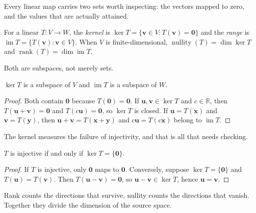 Every linear map carries two sets worth inspecting: the vectors mapped to zero,
and the values that are actually attained.


\begin{definisi}
For a linear $T\colon V\to W$, the \emph{kernel} is
$\ker T=\{\mathbf{v}\in V: T(\mathbf{v})=\mathbf{0}\}$ and the \emph{range} is
$\operatorname{im}T=\{T(\mathbf{v}):\mathbf{v}\in V\}$. When $V$ is finite-dimensional,
$\operatorname{nullity}(T)=\dim\ker T$ and $\operatorname{rank}(T)=\dim\operatorname{im}T$.
\end{definisi}

Both are subspaces, not merely sets.

\begin{lemma}
$\ker T$ is a subspace of $V$ and $\operatorname{im}T$ is a subspace of $W$.
\end{lemma}

\begin{proof}
Both contain $\mathbf{0}$ because $T(\mathbf{0})=\mathbf{0}$. If
$\mathbf{u},\mathbf{v}\in\ker T$
and $c\in\mathbb{R}$, then $T(\mathbf{u}+\mathbf{v})=\mathbf{0}$ and
$T(c\mathbf{u})=\mathbf{0}$,
so $\ker T$ is closed. If $\mathbf{u}=T(\mathbf{x})$ and $\mathbf{v}=T(\mathbf{y})$, then
$\mathbf{u}+\mathbf{v}=T(\mathbf{x}+\mathbf{y})$ and $c\mathbf{u}=T(c\mathbf{x})$ belong to
$\operatorname{im}T$.
\end{proof}

The kernel measures the failure of injectivity, and that is all that needs checking.

\begin{proposisi}
$T$ is injective if and only if $\ker T=\{\mathbf{0}\}$.
\end{proposisi}

\begin{proof}
If $T$ is injective, only $\mathbf{0}$ maps to $\mathbf{0}$. Conversely, suppose
$\ker T=\{\mathbf{0}\}$ and $T(\mathbf{u})=T(\mathbf{v})$. Then $T(\mathbf{u}-\mathbf{v})=\mathbf{0}$,
so $\mathbf{u}-\mathbf{v}\in\ker T$, hence $\mathbf{u}=\mathbf{v}$.
\end{proof}

Rank counts the directions that survive, nullity counts the directions that vanish. Together
they divide the dimension of the source space.


